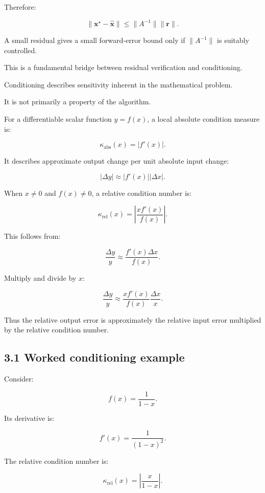 Therefore:

\[ \boxed{ \|\mathbf x^\star-\hat{\mathbf x}\| \le \|A^{-1}\|\|\mathbf r\| }. \]

A small residual gives a small forward-error bound only if \(\|A^{-1}\|\) is suitably controlled.

This is a fundamental bridge between residual verification and conditioning.

Conditioning describes sensitivity inherent in the mathematical problem.

It is not primarily a property of the algorithm.

For a differentiable scalar function \(y=f(x)\), a local absolute condition measure is:

\[ \boxed{ \kappa_{\mathrm{abs}}(x)=|f'(x)| }. \]

It describes approximate output change per unit absolute input change:

\[ |\Delta y|\approx|f'(x)||\Delta x|. \]

When \(x\ne0\) and \(f(x)\ne0\), a relative condition number is:

\[ \boxed{ \kappa_{\mathrm{rel}}(x) = \left| \frac{xf'(x)}{f(x)} \right| }. \]

This follows from:

\[ \frac{\Delta y}{y} \approx \frac{f'(x)\Delta x}{f(x)}. \]

Multiply and divide by \(x\):

\[ \frac{\Delta y}{y} \approx \frac{xf'(x)}{f(x)} \frac{\Delta x}{x}. \]

Thus the relative output error is approximately the relative input error multiplied by the relative condition number.

\subsection{3.1 Worked conditioning example}\label{02-foundations-ii-ch028-worked-conditioning-example}

\hypertarget{02-foundations-ii-ch028-worked-conditioning-example}{}

Consider:

\[ f(x)=\frac1{1-x}. \]

Its derivative is:

\[ f'(x)=\frac1{(1-x)^2}. \]

The relative condition number is:

\[ \kappa_{\mathrm{rel}}(x) = \left| \frac{x}{1-x} \right|. \]

